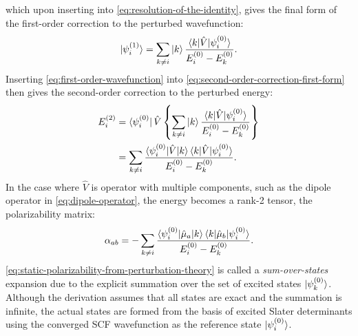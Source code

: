 \documentclass[%
class = book,%
crop = false,%
float = true,%
multi = true,%
preview = false,%
]{standalone}
\begin{document}
which upon inserting into \eqref{eq:resolution-of-the-identity}, gives the final form of the first-order correction to the perturbed wavefunction:
\begin{equation}
  \label{eq:first-order-wavefunction}
  \ket{\psi_{i}^{(1)}} = \sum_{k\neq i} \ket{k} \frac{\braket{k|\hat{V}|\psi_{i}^{(0)}}}{E_{i}^{(0)} - E_{k}^{(0)}}.
\end{equation}
Inserting \eqref{eq:first-order-wavefunction} into \eqref{eq:second-order-correction-first-form} then gives the second-order correction to the perturbed energy:
\begin{equation}
  \label{eq:second-order-energy}
  \begin{aligned}
    E_{i}^{(2)} &= \bra{\psi_{i}^{(0)}} \hat{V} \left\{ \sum_{k\neq i} \ket{k} \frac{\braket{k|\hat{V}|\psi_{i}^{(0)}}}{E_{i}^{(0)} - E_{k}^{(0)}} \right\} \\
    &= \sum_{k \neq i} \frac{\braket{\psi_{i}^{(0)}|\hat{V}|k}\braket{k|\hat{V}|\psi_{i}^{(0)}}}{E_{i}^{(0)} - E_{k}^{(0)}}.
  \end{aligned}
\end{equation}
In the case where \(\hat{V}\) is operator with multiple components, such as the dipole operator in \eqref{eq:dipole-operator}, the energy becomes a rank-2 tensor, the polarizability matrix:
\begin{equation}
  \label{eq:static-polarizability-from-perturbation-theory}
  \alpha_{ab}= - \sum_{k \neq i} \frac{\braket{\psi_{i}^{(0)}|\hat{\mu}_{a}|k}\braket{k|\hat{\mu}_{b}|\psi_{i}^{(0)}}}{E_{i}^{(0)} - E_{k}^{(0)}}.
\end{equation} %
\eqref{eq:static-polarizability-from-perturbation-theory} is called a \emph{sum-over-states} expansion due to the explicit summation over the set of excited states \(\ket{\psi_{k}^{(0)}}\). Although the derivation assumes that all states are exact and the summation is infinite, the actual states are formed from the basis of excited Slater determinants using the converged SCF wavefunction as the reference state \(\ket{\psi_{i}^{(0)}}\).

\section{\texorpdfstring{}{Dynamic (frequency-dependent) response properties}}
\label{sec:dynamic-properties}
\end{document}
